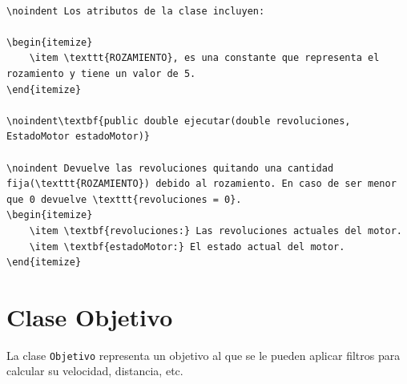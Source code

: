 \documentclass{article}
\begin{document}
\begin{lstlisting}

\noindent Los atributos de la clase incluyen:

\begin{itemize}
    \item \texttt{ROZAMIENTO}, es una constante que representa el rozamiento y tiene un valor de 5. 
\end{itemize}

\noindent\textbf{public double ejecutar(double revoluciones, EstadoMotor estadoMotor)} 

\noindent Devuelve las revoluciones quitando una cantidad fija(\texttt{ROZAMIENTO}) debido al rozamiento. En caso de ser menor que 0 devuelve \texttt{revoluciones = 0}.
\begin{itemize}
    \item \textbf{revoluciones:} Las revoluciones actuales del motor.
    \item \textbf{estadoMotor:} El estado actual del motor.
\end{itemize}

\end{lstlisting}


\section{Clase Objetivo}

La clase \texttt{Objetivo} representa un objetivo al que se le pueden aplicar filtros para calcular su velocidad, distancia, etc.
\end{document}
